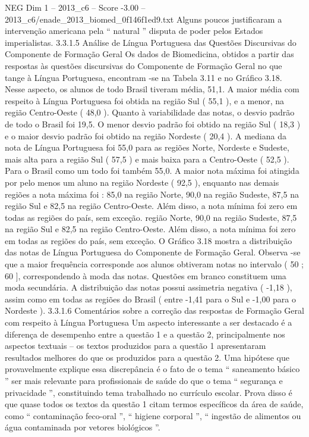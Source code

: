 \begin{textsample}{NEG Dim 1 – 2013\_c6 – Score -3.00 – 2013\_c6/enade\_2013\_biomed\_0f146f1ed9.txt}
Alguns poucos justificaram a intervenção americana pela “ natural ” disputa de poder pelos Estados imperialistas. 3.3.1.5 Análise de Língua Portuguesa das Questões Discursivas do Componente de Formação Geral Os dados de Biomedicina, obtidos a partir das respostas às questões discursivas do Componente de Formação Geral no que tange à Língua Portuguesa, encontram -se na Tabela 3.11 e no Gráfico 3.18.
Nesse aspecto, os alunos de todo Brasil tiveram média, 51,1.
A maior média com respeito à Língua Portuguesa foi obtida na região Sul ( 55,1 ), e a menor, na região Centro-Oeste ( 48,0 ).
Quanto à variabilidade das notas, o desvio padrão de todo o Brasil foi 19,5.
O menor desvio padrão foi obtido na região Sul ( 18,3 ) e o maior desvio padrão foi obtido na região Nordeste ( 20,4 ).
A mediana da nota de Língua Portuguesa foi 55,0 para as regiões Norte, Nordeste e Sudeste, mais alta para a região Sul ( 57,5 ) e mais baixa para a Centro-Oeste ( 52,5 ).
Para o Brasil como um todo foi também 55,0.
A maior nota máxima foi atingida por pelo menos um aluno na região Nordeste ( 92,5 ), enquanto nas demais regiões a nota máxima foi : 85,0 na região Norte, 90,0 na região Sudeste, 87,5 na região Sul e 82,5 na região Centro-Oeste.
Além disso, a nota mínima foi zero em todas as regiões do país, sem exceção. região Norte, 90,0 na região Sudeste, 87,5 na região Sul e 82,5 na região Centro-Oeste.
Além disso, a nota mínima foi zero em todas as regiões do país, sem exceção.
O Gráfico 3.18 mostra a distribuição das notas de Língua Portuguesa do Componente de Formação Geral.
Observa -se que a maior frequência corresponde aos alunos obtiveram notas no intervalo ( 50 ; 60 ], correspondendo à moda das notas.
Questões em branco constituem uma moda secundária.
A distribuição das notas possui assimetria negativa ( -1,18 ), assim como em todas as regiões do Brasil ( entre -1,41 para o Sul e -1,00 para o Nordeste ). 3.3.1.6 Comentários sobre a correção das respostas de Formação Geral com respeito à Língua Portuguesa Um aspecto interessante a ser destacado é a diferença de desempenho entre a questão 1 e a questão 2, principalmente nos aspectos textuais – os textos produzidos para a questão 1 apresentaram resultados melhores do que os produzidos para a questão 2.
Uma hipótese que provavelmente explique essa discrepância é o fato de o tema “ saneamento básico ” ser mais relevante para profissionais de saúde do que o tema “ segurança e privacidade ”, constituindo tema trabalhado no currículo escolar.
Prova disso é que quase todos os textos da questão 1 citam termos específicos da área de saúde, como “ contaminação feco-oral ”, “ higiene corporal ”, “ ingestão de alimentos ou água contaminada por vetores biológicos ”.

\end{textsample}
